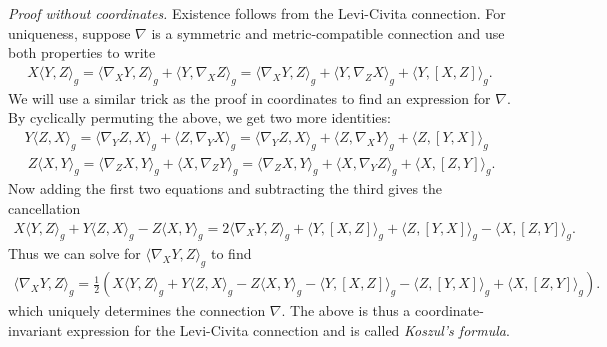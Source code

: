\documentclass[
]{article}
\begin{document}
\emph{Proof without coordinates.} Existence follows from the Levi-Civita
connection. For uniqueness, suppose \(\nabla\) is a symmetric and
metric-compatible connection and use both properties to write
\begin{align}
    X\langle Y , Z\rangle_g 
    = \langle \nabla_X Y , Z \rangle_g + \langle Y , \nabla_X Z \rangle_g
    = \langle \nabla_X Y , Z \rangle_g + \langle Y , \nabla_Z X \rangle_g + \langle Y , [X, Z]\rangle_g.
\end{align} We will use a similar trick as the proof in coordinates to
find an expression for \(\nabla\). By cyclically permuting the above, we
get two more identities: \begin{align}
    Y\langle Z , X\rangle_g 
    = \langle \nabla_Y Z , X \rangle_g + \langle Z , \nabla_Y X \rangle_g
    = \langle \nabla_Y Z , X \rangle_g + \langle Z , \nabla_X Y \rangle_g + \langle Z , [Y, X]\rangle_g\\\
    Z\langle X , Y\rangle_g 
    = \langle \nabla_Z X , Y \rangle_g + \langle X , \nabla_Z Y \rangle_g
    = \langle \nabla_Z X , Y \rangle_g + \langle X , \nabla_Y Z \rangle_g + \langle X , [Z, Y]\rangle_g.
\end{align} Now adding the first two equations and subtracting the third
gives the cancellation \begin{align}
X\langle Y , Z\rangle_g  + Y\langle Z , X\rangle_g - Z\langle X , Y\rangle_g
= 2 \langle \nabla_X Y , Z \rangle_g + \langle Y , [X, Z]\rangle_g + \langle Z , [Y, X]\rangle_g - \langle X , [Z, Y]\rangle_g.
\end{align} Thus we can solve for \(\langle \nabla_X Y , Z \rangle_g\)
to find \begin{align}
\langle \nabla_X Y , Z \rangle_g
= \frac{1}{2}(X\langle Y , Z\rangle_g  + Y\langle Z , X\rangle_g - Z\langle X , Y\rangle_g - \langle Y , [X, Z]\rangle_g - \langle Z , [Y, X]\rangle_g + \langle X , [Z, Y]\rangle_g).
\end{align} which uniquely determines the connection \(\nabla\). The
above is thus a coordinate-invariant expression for the Levi-Civita
connection and is called \emph{Koszul's formula}.
\end{document}
